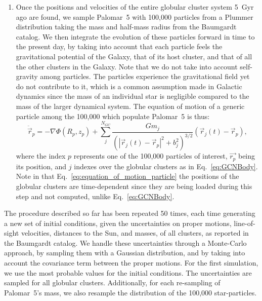 \documentclass[draft]{aa}
\begin{document}
\begin{enumerate}
        \item Once the positions and velocities of the entire globular cluster system 5~Gyr ago are found, we sample Palomar~5 with 100,000 particles from a Plummer distribution taking the mass and half-mass radius from the Baumgardt catalog. We then integrate the evolution of these particles forward in time to the present day, by taking into account that each particle feels the gravitational potential of the Galaxy, that of its host cluster, and that of all the other clusters in the Galaxy. Note that we do not take into account self-gravity among particles. The particles experience the gravitational field yet do not contribute to it, which is a common assumption made in Galactic dynamics since the mass of an individual star is negligible compared to the mass of the larger dynamical system. The equation of motion of a generic particle among the 100,000 which populate Palomar~5 is thus: 
        \begin{equation}
          \ddot{\vec{r}}_p = -\nabla \Phi(R_p,z_p) + \left.\sum_{j}^{N_{GC}} \frac{Gm_j}{\left(|\vec{r}_j(t) - \vec{r}_p|^2 + b_j^2\right)^{3/2}}\right. \left(\vec{r}_j(t)- \vec{r}_p\right),
          \end{equation} \label{eq:equation_of_motion_particle} where the index $p$ represents one of the 100,000 particles of interest, $\vec{r_p}$ being its position, and $j$ indexes over the globular clusters as in Eq.~\ref{eq:GCNBody}. Note in that Eq.~\ref{eq:equation_of_motion_particle} the positions of the globular clusters are time-dependent since they are being loaded during this step and not computed, unlike Eq.~\ref{eq:GCNBody}. 

      \end{enumerate}




        The procedure described so far has been repeated 50 times, each time generating a new set of initial conditions, given the uncertainties on proper motions, line-of-sight velocities, distances to the Sun, and masses, of all clusters, as reported in the Baumgardt catalog. We handle these uncertainties through a Monte-Carlo approach, by sampling them with a Gaussian distribution, and by taking into account the covariance term between the proper motions. For the first simulation, we use the most probable values for the initial conditions. The uncertainties are sampled for all globular clusters. Additionally, for each re-sampling of Palomar~5's mass, we also resample the distribution of the 100,000 star-particles. 
\end{document}
